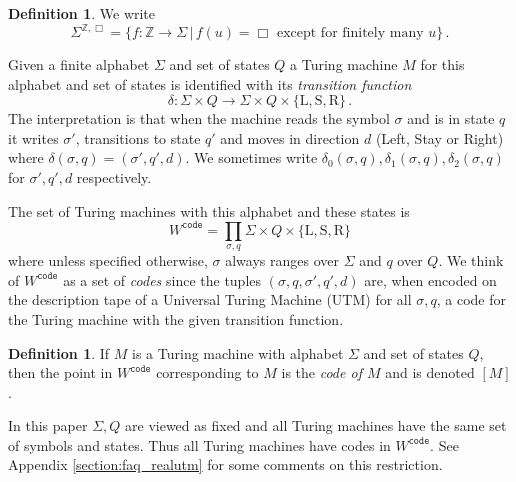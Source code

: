 \documentclass[english,letter paper,12pt,reqno]{article}
\theoremstyle{definition}
\newtheorem{definition}[theorem]{Definition}
\newcommand{\lto}{\longrightarrow}
\def\l{\,|\,}
\begin{document}
\begin{definition}\label{defn:finsupstate} We write
\[
\Sigma^{\mathbb{Z}, \Box} = \{ f: \mathbb{Z} \lto \Sigma \l f(u) = \Box \text{ except for finitely many $u$} \}\,.
\]
\end{definition}

Given a finite alphabet $\Sigma$ and set of states $Q$ a Turing machine $M$ for this alphabet and set of states is identified with its \emph{transition function}
\begin{equation}
\delta: \Sigma \times Q \lto \Sigma \times Q \times \{ \text{L}, \text{S}, \text{R} \}\,.
\end{equation}
The interpretation is that when the machine reads the symbol $\sigma$ and is in state $q$ it writes $\sigma'$, transitions to state $q'$ and moves in direction $d$ (Left, Stay or Right) where $\delta(\sigma,q) = (\sigma', q', d)$. We sometimes write $\delta_0(\sigma,q), \delta_1(\sigma,q), \delta_2(\sigma,q)$ for $\sigma',q',d$ respectively.

The set of Turing machines with this alphabet and these states is
\begin{equation}
    W^{\texttt{code}} = \prod_{\sigma, q}\Sigma \times Q \times \{\text{L}, \text{S}, \text{R}\}
\end{equation}
where unless specified otherwise, $\sigma$ always ranges over $\Sigma$ and $q$ over $Q$. We think of $W^{\texttt{code}}$ as a set of \emph{codes} since the tuples $(\sigma, q, \sigma', q', d)$ are, when encoded on the description tape of a Universal Turing Machine (UTM) for all $\sigma,q$, a code for the Turing machine with the given transition function.

\begin{definition}
\label{def:code_of_T}
    If $M$ is a Turing machine with alphabet $\Sigma$ and set of states $Q$, then the point in $W^{\texttt{code}}$ corresponding to $M$ is the \emph{code of $M$} and is denoted $[M]$.
\end{definition}

In this paper $\Sigma, Q$ are viewed as fixed and all Turing machines have the same set of symbols and states. Thus all Turing machines have codes in $W^{\texttt{code}}$. See Appendix \ref{section:faq_realutm} for some comments on this restriction. 
\end{document}
